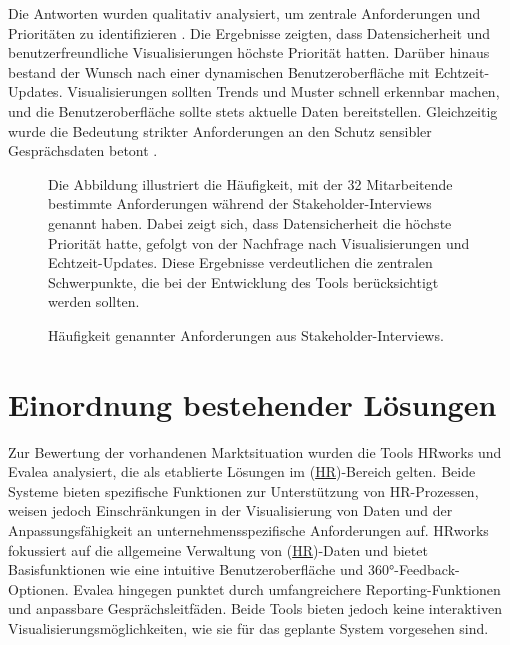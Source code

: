 Die Antworten wurden qualitativ analysiert, um zentrale Anforderungen und Prioritäten zu identifizieren \cite{flick2009qualitative}. Die Ergebnisse zeigten, dass Datensicherheit und benutzerfreundliche Visualisierungen höchste Priorität hatten. Darüber hinaus bestand der Wunsch nach einer dynamischen Benutzeroberfläche mit Echtzeit-Updates. Visualisierungen sollten Trends und Muster schnell erkennbar machen, und die Benutzeroberfläche sollte stets aktuelle Daten bereitstellen. Gleichzeitig wurde die Bedeutung strikter Anforderungen an den Schutz sensibler Gesprächsdaten betont \cite{kirk2016data, bryson2011employee}.

\begin{figure}[h!]
\centering
Die Abbildung illustriert die Häufigkeit, mit der 32 Mitarbeitende bestimmte Anforderungen während der Stakeholder-Interviews genannt haben. Dabei zeigt sich, dass Datensicherheit die höchste Priorität hatte, gefolgt von der Nachfrage nach Visualisierungen und Echtzeit-Updates. Diese Ergebnisse verdeutlichen die zentralen Schwerpunkte, die bei der Entwicklung des Tools berücksichtigt werden sollten.

 \caption{Häufigkeit genannter Anforderungen aus Stakeholder-Interviews.} \label{fig:stakeholder_results_barchart} \end{figure}

\section{Einordnung bestehender Lösungen}
Zur Bewertung der vorhandenen Marktsituation wurden die Tools HRworks und Evalea analysiert, die als etablierte Lösungen im (\hyperref[abkuerzungen]{HR})-Bereich gelten. Beide Systeme bieten spezifische Funktionen zur Unterstützung von HR-Prozessen, weisen jedoch Einschränkungen in der Visualisierung von Daten und der Anpassungsfähigkeit an unternehmensspezifische Anforderungen auf. HRworks fokussiert auf die allgemeine Verwaltung von (\hyperref[abkuerzungen]{HR})-Daten und bietet Basisfunktionen wie eine intuitive Benutzeroberfläche und 360°-Feedback-Optionen. Evalea hingegen punktet durch umfangreichere Reporting-Funktionen und anpassbare Gesprächsleitfäden. Beide Tools bieten jedoch keine interaktiven Visualisierungsmöglichkeiten, wie sie für das geplante System vorgesehen sind.

